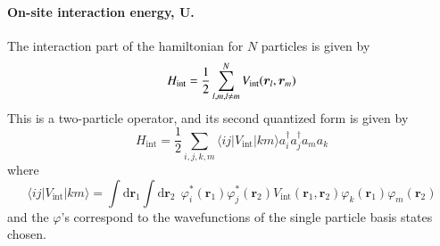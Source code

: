 \documentclass[oneside,11pt]{memoir}
\newcommand{\bv}[1]{\ensuremath{\bm{#1}}}
\begin{document}
\paragraph{On-site interaction energy, $\bm{U}$.}

The interaction part of the hamiltonian for $N$ particles is
given by \begin{equation}
    H_{\text{int}} = 
         \frac{1}{2}\sum_{ l,m, l\neq m}^{N} 
         V_{\mathrm{int}}(\bv{r}_{l},\bv{r}_{m} )\\ 
\end{equation}
This is a two-particle operator, and its second quantized form is given by
\begin{equation}
   H_{\text{int}} = \frac{1}{2} \sum_{i,j,k,m} 
           \langle ij | V_{\mathrm{int}} | km \rangle
           a_{i}^{\dagger} a_{j}^{\dagger} a_{m} a_{k}
\end{equation}
where 
\begin{equation}
    \langle ij | V_{\mathrm{int}} | km \rangle =
    \int \mathrm{d}\bv{r}_{1} \int \mathrm{d}\bv{r}_{2} \ \  
    \varphi_{i}^{*}(\bv{r}_{1}) \varphi_{j}^{*}(\bv{r}_{2}) 
    V_{\mathrm{int}}(\bv{r}_{1},\bv{r}_{2}) 
    \varphi_{k}(\bv{r}_{1}) \varphi_{m}(\bv{r}_{2}) 
\end{equation}
and the $\varphi$'s correspond to the wavefunctions of the single particle
basis states chosen. 
\end{document}
